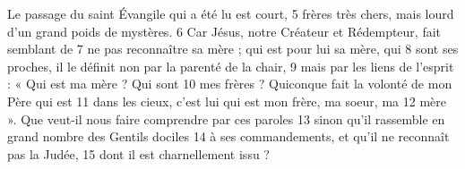 Le passage du saint Évangile qui a été lu est court,	 
5	 	frères très chers, mais lourd d'un grand poids de mystères.	 
6	 	Car Jésus, notre Créateur et Rédempteur, fait semblant de	 
7	 	ne pas reconnaître sa mère ; qui est pour lui sa mère, qui	 
8	 	sont ses proches, il le définit non par la parenté de la chair,	 
9	 	mais par les liens de l'esprit : « Qui est ma mère ? Qui sont	 
10	 	mes frères ? Quiconque fait la volonté de mon Père qui est	 
11	 	dans les cieux, c'est lui qui est mon frère, ma soeur, ma	 
12	 	mère ». Que veut-il nous faire comprendre par ces paroles	 
13	 	sinon qu'il rassemble en grand nombre des Gentils dociles	 
14	 	à ses commandements, et qu'il ne reconnaît pas la Judée,	 
15	 	dont il est charnellement issu ?